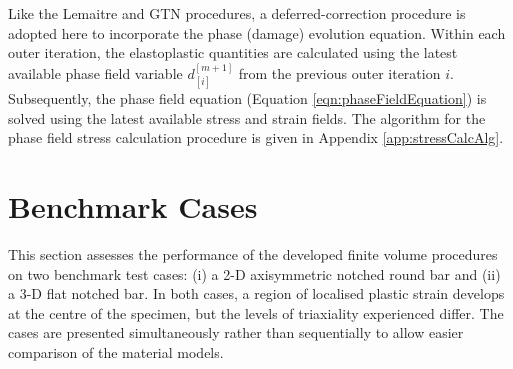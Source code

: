 \documentclass[sn-mathphys,Numbered]{sn-jnl}%
\begin{document}

Like the Lemaitre and GTN procedures, a deferred-correction procedure is adopted here to incorporate the phase (damage) evolution equation.
Within each outer iteration, the elastoplastic quantities are calculated using the latest available phase field variable $d^{[m+1]}_{[i]}$ from the previous outer iteration $i$.
Subsequently, the phase field equation (Equation \ref{eqn:phaseFieldEquation}) is solved using the latest available stress and strain fields.
The algorithm for the phase field stress calculation procedure is given in Appendix \ref{app:stressCalcAlg}. %















\section{Benchmark Cases} \label{sec:test_cases}

This section assesses the performance of the developed finite volume procedures on two benchmark test cases: (i) a 2-D axisymmetric notched round bar and (ii) a 3-D flat notched bar. %
In both cases, a region of localised plastic strain develops at the centre of the specimen, but the levels of triaxiality experienced differ.
The cases are presented simultaneously rather than sequentially to allow easier comparison of the material models.
\end{document}
